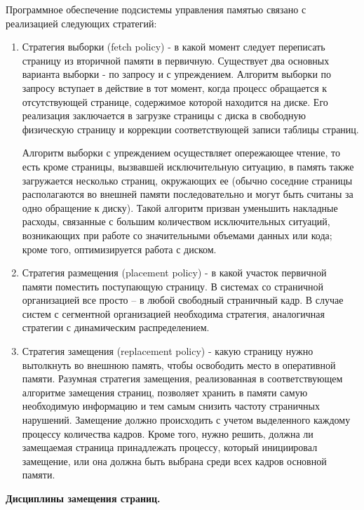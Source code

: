 \begin{utv}
  Программное обеспечение подсистемы управления памятью связано с реализацией следующих стратегий:
  \begin{enumerate}
    \item Стратегия выборки (fetch policy) - в какой момент следует переписать страницу из вторичной памяти в первичную. Существует два основных варианта выборки - по запросу и с упреждением. Алгоритм выборки по запросу вступает в действие в тот момент, когда процесс обращается к отсутствующей странице, содержимое которой находится на диске. Его реализация заключается в загрузке страницы с диска в свободную физическую страницу и коррекции соответствующей записи таблицы страниц.
    
    Алгоритм выборки с упреждением осуществляет опережающее чтение, то есть кроме страницы, вызвавшей исключительную ситуацию, в память также загружается несколько страниц, окружающих ее (обычно соседние страницы располагаются во внешней памяти последовательно и могут быть считаны за одно обращение к диску). Такой алгоритм призван уменьшить накладные расходы, связанные с большим количеством исключительных ситуаций, возникающих при работе со значительными объемами данных или кода; кроме того, оптимизируется работа с диском.
    \item Стратегия размещения (placement policy) - в какой участок первичной памяти поместить поступающую страницу. В системах со страничной организацией все просто – в любой свободный страничный кадр. В случае систем с сегментной организацией необходима стратегия, аналогичная стратегии с динамическим распределением.
    \item Стратегия замещения (replacement policy) - какую страницу нужно вытолкнуть во внешнюю память, чтобы освободить место в оперативной памяти. Разумная стратегия замещения, реализованная в соответствующем алгоритме замещения страниц, позволяет хранить в памяти самую необходимую информацию и тем самым снизить частоту страничных нарушений. Замещение должно происходить с учетом выделенного каждому процессу количества кадров. Кроме того, нужно решить, должна ли замещаемая страница принадлежать процессу, который инициировал замещение, или она должна быть выбрана среди всех кадров основной памяти.
  \end{enumerate}
\end{utv}

\begin{center}{\bfseries Дисциплины замещения страниц.}
\end{center}

